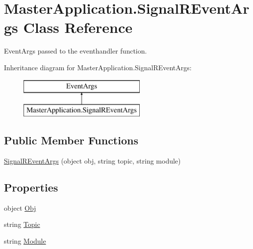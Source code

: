 \hypertarget{class_master_application_1_1_signal_r_event_args}{}\section{Master\+Application.\+Signal\+R\+Event\+Args Class Reference}
\label{class_master_application_1_1_signal_r_event_args}


Event\+Args passed to the eventhandler function.  


Inheritance diagram for Master\+Application.\+Signal\+R\+Event\+Args\+:\begin{figure}[H]
\begin{center}
\leavevmode
\includegraphics[height=2.000000cm]{class_master_application_1_1_signal_r_event_args}
\end{center}
\end{figure}
\subsection*{Public Member Functions}
\begin{DoxyCompactItemize}
\item 
\mbox{\hyperlink{class_master_application_1_1_signal_r_event_args_a6ba9d72cad5a60585c5e4fdcc1865540}{Signal\+R\+Event\+Args}} (object obj, string topic, string module)
\end{DoxyCompactItemize}
\subsection*{Properties}
\begin{DoxyCompactItemize}
\item 
object \mbox{\hyperlink{class_master_application_1_1_signal_r_event_args_ace89df7fa55d53de03a1a9d411a9f596}{Obj}}
\item 
string \mbox{\hyperlink{class_master_application_1_1_signal_r_event_args_a4f744958b044e04c2dc9b70557fbd906}{Topic}}
\item 
string \mbox{\hyperlink{class_master_application_1_1_signal_r_event_args_a9f4b44643fb278521349320625c1cb98}{Module}}
\end{DoxyCompactItemize}



